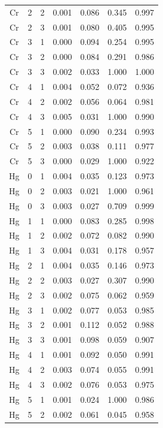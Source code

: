 \documentclass[ms, hidelinks]{uncgdissertationexp3}
\theoremstyle{plain}
\theoremstyle{definition}
\theoremstyle{remark}
\begin{document}
\begin{longtable}{ccccccc}
  Cr & 2 & 2 & 0.001 & 0.086 & 0.345 & 0.997\\
  \rowcolor{gray!6}  Cr & 2 & 3 & 0.001 & 0.080 & 0.405 & 0.995\\
  Cr & 3 & 1 & 0.000 & 0.094 & 0.254 & 0.995\\
  \rowcolor{gray!6}  Cr & 3 & 2 & 0.000 & 0.084 & 0.291 & 0.986\\
  Cr & 3 & 3 & 0.002 & 0.033 & 1.000 & 1.000\\
  \rowcolor{gray!6}  Cr & 4 & 1 & 0.004 & 0.052 & 0.072 & 0.936\\
  Cr & 4 & 2 & 0.002 & 0.056 & 0.064 & 0.981\\
  \rowcolor{gray!6}  Cr & 4 & 3 & 0.005 & 0.031 & 1.000 & 0.990\\
  Cr & 5 & 1 & 0.000 & 0.090 & 0.234 & 0.993\\
  \rowcolor{gray!6}  Cr & 5 & 2 & 0.003 & 0.038 & 0.111 & 0.977\\
  Cr & 5 & 3 & 0.000 & 0.029 & 1.000 & 0.922\\
  \rowcolor{gray!6}  Hg & 0 & 1 & 0.004 & 0.035 & 0.123 & 0.973\\
  Hg & 0 & 2 & 0.003 & 0.021 & 1.000 & 0.961\\
  \rowcolor{gray!6}  Hg & 0 & 3 & 0.003 & 0.027 & 0.709 & 0.999\\
  Hg & 1 & 1 & 0.000 & 0.083 & 0.285 & 0.998\\
  \rowcolor{gray!6}  Hg & 1 & 2 & 0.002 & 0.072 & 0.082 & 0.990\\
  Hg & 1 & 3 & 0.004 & 0.031 & 0.178 & 0.957\\
  \rowcolor{gray!6}  Hg & 2 & 1 & 0.004 & 0.035 & 0.146 & 0.973\\
  Hg & 2 & 2 & 0.003 & 0.027 & 0.307 & 0.990\\
  \rowcolor{gray!6}  Hg & 2 & 3 & 0.002 & 0.075 & 0.062 & 0.959\\
  Hg & 3 & 1 & 0.002 & 0.077 & 0.053 & 0.985\\
  \rowcolor{gray!6}  Hg & 3 & 2 & 0.001 & 0.112 & 0.052 & 0.988\\
  Hg & 3 & 3 & 0.001 & 0.098 & 0.059 & 0.907\\
  \rowcolor{gray!6}  Hg & 4 & 1 & 0.001 & 0.092 & 0.050 & 0.991\\
  Hg & 4 & 2 & 0.003 & 0.074 & 0.055 & 0.991\\
  \rowcolor{gray!6}  Hg & 4 & 3 & 0.002 & 0.076 & 0.053 & 0.975\\
  Hg & 5 & 1 & 0.001 & 0.024 & 1.000 & 0.986\\
  \rowcolor{gray!6}  Hg & 5 & 2 & 0.002 & 0.061 & 0.045 & 0.958\\

\end{longtable}
\end{document}
